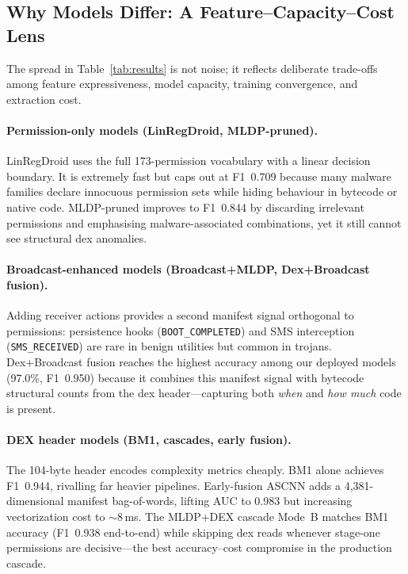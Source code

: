 \subsection{Why Models Differ: A Feature--Capacity--Cost Lens}
The spread in Table~\ref{tab:results} is not noise; it reflects deliberate trade-offs among feature expressiveness, model capacity, training convergence, and extraction cost.

\paragraph{Permission-only models (LinRegDroid, MLDP-pruned).}
LinRegDroid uses the full 173-permission vocabulary with a linear decision boundary. It is extremely fast but caps out at F1~0.709 because many malware families declare innocuous permission sets while hiding behaviour in bytecode or native code. MLDP-pruned improves to F1~0.844 by discarding irrelevant permissions and emphasising malware-associated combinations, yet it still cannot see structural dex anomalies.

\paragraph{Broadcast-enhanced models (Broadcast+MLDP, Dex+Broadcast fusion).}
Adding receiver actions provides a second manifest signal orthogonal to permissions: persistence hooks (\texttt{BOOT\_COMPLETED}) and SMS interception (\texttt{SMS\_RECEIVED}) are rare in benign utilities but common in trojans. Dex+Broadcast fusion reaches the highest accuracy among our deployed models (97.0\%, F1~0.950) because it combines this manifest signal with bytecode structural counts from the dex header---capturing both \emph{when} and \emph{how much} code is present.

\paragraph{DEX header models (BM1, cascades, early fusion).}
The 104-byte header encodes complexity metrics cheaply. BM1 alone achieves F1~0.944, rivalling far heavier pipelines. Early-fusion ASCNN adds a 4,381-dimensional manifest bag-of-words, lifting AUC to 0.983 but increasing vectorization cost to $\sim$8\,ms. The MLDP+DEX cascade Mode~B matches BM1 accuracy (F1~0.938 end-to-end) while skipping dex reads whenever stage-one permissions are decisive---the best accuracy--cost compromise in the production cascade.

